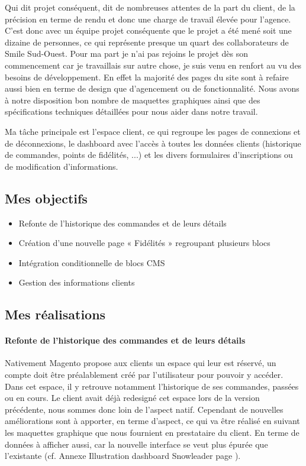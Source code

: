 \documentclass[a4paper,11pt,twoside]{report}
\begin{document}
    Qui dit projet conséquent, dit de nombreuses attentes de la part du client, de la précision en terme de rendu et donc une charge de travail élevée pour l'agence. C'est donc avec un équipe projet conséquente que le projet a été mené soit une dizaine de personnes, ce qui représente presque un quart des collaborateurs de Smile Sud-Ouest. Pour ma part je n'ai pas rejoins le projet dès son commencement car je travaillais sur autre chose, je suis venu en renfort au vu des besoins de développement. En effet la majorité des pages du site sont à refaire aussi bien en terme de design que d'agencement ou de fonctionnalité. Nous avons à notre disposition bon nombre de maquettes graphiques ainsi que des spécifications techniques détaillées pour nous aider dans notre travail. 
    
    Ma tâche principale est l'espace client, ce qui regroupe les pages de connexions et de déconnexions, le dashboard avec l'accès à toutes les données clients (historique de commandes, points de fidélités, ...) et les divers formulaires d'inscriptions ou de modification d'informations. 
    \subsection*{Mes objectifs}
      \begin{itemize}

	\item Refonte de l'historique des commandes et de leurs détails 
	\item Création d'une nouvelle page « Fidélités » regroupant plusieurs blocs
	\item Intégration conditionnelle de blocs CMS
	\item Gestion des informations clients

      \end{itemize}
    \subsection*{Mes réalisations}
    	\paragraph*{Refonte de l'historique des commandes et de leurs détails}
    	Nativement Magento propose aux clients un espace qui leur est réservé, un compte doit être préalablement créé par l'utilisateur pour pouvoir y accéder. Dans cet espace, il y retrouve notamment l'historique de ses commandes, passées ou en cours. Le client avait déjà redesigné cet espace lors de la version précédente, nous sommes donc loin de l'aspect natif. Cependant de nouvelles améliorations sont à apporter, en terme d'aspect, ce qui va être réalisé en suivant les maquettes graphique que nous fournient en prestataire du client. En terme de données à afficher aussi, car la nouvelle interface se veut plus épurée que l'existante (cf. Annexe Illustration dashboard Snowleader page \pageref{SL_dashboard_customer}). 
    
\end{document}
